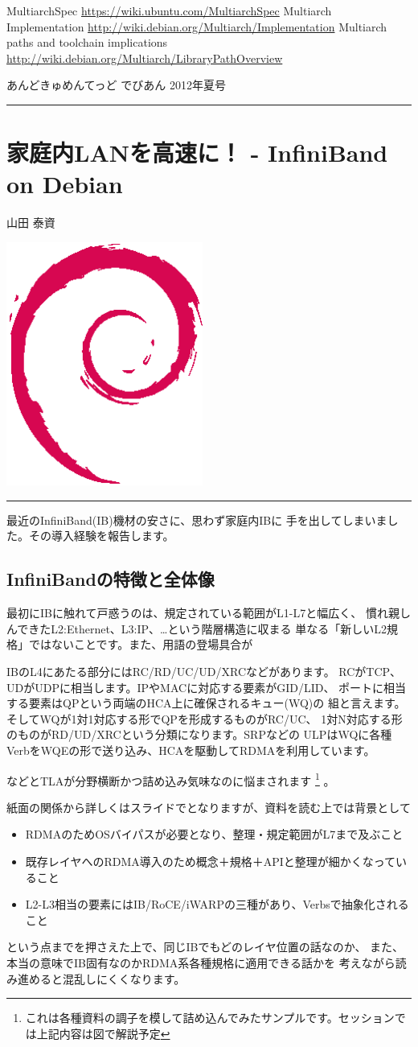 \documentclass[mingoth,a4paper]{jsarticle}
\renewcommand{\dancersection}[2]{%
\newpage
あんどきゅめんてっど でびあん 2012年夏号
%
\vspace{0.1mm}\\
{\color{dancerdarkblue}\rule{\hsize}{2mm}}

%
%
\begin{minipage}[t]{0.6\hsize}
\color{dancerdarkblue}
\vspace{1cm}
\section{#1}
\hfill{}#2\\
\end{minipage}
\begin{minipage}[t]{0.4\hsize}
\vspace{-2cm}
\hfill{}\includegraphics[height=8cm]{image200502/openlogo-nd.eps}\\
\vspace{-5cm}
\end{minipage}
%
{\color{dancerlightblue}\rule{0.66\hsize}{2mm}}
%
\vspace{2cm}
}
\begin{document}
\begin{thebibliography}{8}
 MultiarchSpec \url{https://wiki.ubuntu.com/MultiarchSpec}
 Multiarch Implementation \url{http://wiki.debian.org/Multiarch/Implementation}
 Multiarch paths and toolchain implications \url{http://wiki.debian.org/Multiarch/LibraryPathOverview}
\end{thebibliography}


\dancersection{家庭内LANを高速に！ - InfiniBand on Debian}{山田 泰資}
\label{sec:ibdebian}

最近のInfiniBand(IB)\cite{IBSPEC}機材の安さに、思わず家庭内IBに
手を出してしまいました。その導入経験を報告します。

\subsection{InfiniBandの特徴と全体像}
最初にIBに触れて戸惑うのは、規定されている範囲がL1-L7と幅広く、
慣れ親しんできたL2:Ethernet、L3:IP、…という階層構造に収まる
単なる「新しいL2規格」ではないことです。また、用語の登場具合が
\begin{screen}
IBのL4にあたる部分にはRC/RD/UC/UD/XRCなどがあります。
RCがTCP、UDがUDPに相当します。IPやMACに対応する要素がGID/LID、
ポートに相当する要素はQPという両端のHCA上に確保されるキュー(WQ)の
組と言えます。そしてWQが1対1対応する形でQPを形成するものがRC/UC、
1対N対応する形のものがRD/UD/XRCという分類になります。SRPなどの
ULPはWQに各種VerbをWQEの形で送り込み、HCAを駆動してRDMAを利用しています。
\end{screen}
などとTLAが分野横断かつ詰め込み気味なのに悩まされます
\footnote{これは各種資料の調子を模して詰め込んでみたサンプルです。セッションでは上記内容は図で解説予定}
。

紙面の関係から詳しくはスライドでとなりますが、資料を読む上では背景として
\begin{itemize}
\item RDMAのためOSバイパスが必要となり、整理・規定範囲がL7まで及ぶこと
\item 既存レイヤへのRDMA導入のため概念＋規格＋APIと整理が細かくなっていること
\item L2-L3相当の要素にはIB/RoCE/iWARPの三種があり、Verbsで抽象化されること
\end{itemize}
という点までを押さえた上で、同じIBでもどのレイヤ位置の話なのか、
また、本当の意味でIB固有なのかRDMA系各種規格に適用できる話かを
考えながら読み進めると混乱しにくくなります。
\end{document}
